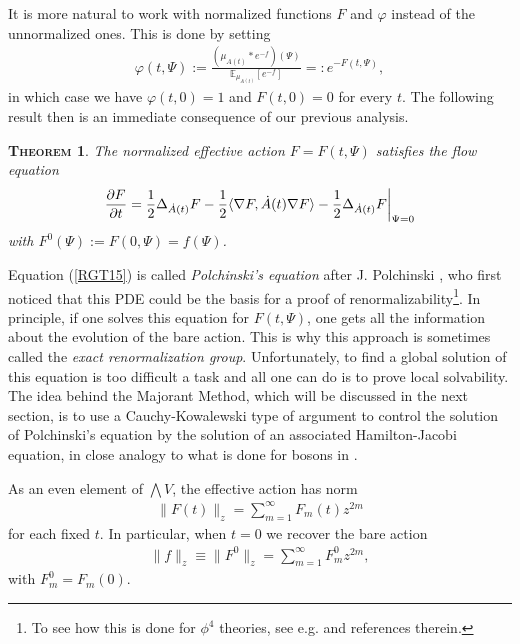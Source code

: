 \documentclass[12pt,twoside]{amsart}
\newcommand{\E}{{\mathbb{E}}}
\newtheorem{theo}{\textsc{Theorem}}[section]
\numberwithin{equation}{section}
\begin{document}
It is more natural to work with normalized functions $F$ and $\varphi$ instead of the unnormalized ones. This is done by setting
\begin{eqnarray}
\varphi(t,\Psi) := \frac{(\mu_{A(t)}*e^{-f})(\Psi)}{\E_{\mu_{A(t)}}[e^{-f}]} =: e^{-F(t,\Psi)}, \label{RGT14}
\end{eqnarray}
in which case we have $\varphi(t, 0) = 1$ and $F(t,0) = 0$ for every $t$. The following result then is an immediate consequence of our previous analysis.

\begin{theo}\label{polchinskiequation} The normalized effective action $F=F(t,\Psi)$ satisfies the flow equation
\begin{eqnarray}
\frac{\partial F}{\partial t} = \frac{1}{2}\Delta_{\dot{A}(t)}F - \frac{1}{2}\langle \nabla F, \dot{A}(t)\nabla F\rangle -\frac{1}{2}\Delta_{\dot{A}(t)}F\bigg{|}_{\Psi = 0} \label{RGT15}
\end{eqnarray}
with $F^{0}(\Psi) := F(0,\Psi) = f(\Psi)$.
\end{theo}

Equation (\ref{RGT15}) is called \textit{Polchinski's equation} after J. Polchinski \cite{Polch}, who first noticed that this PDE could be the basis for a proof of renormalizability\footnote{To see how this is done for $\phi^{4}$ theories, see e.g. \cite{MSbook,KKS} and references therein.}. In principle, if one solves this equation for $F(t,\Psi)$, one gets all the information about the evolution of the bare action. This is why this approach is sometimes called the \textit{exact renormalization group}. Unfortunately, to find a global solution of this equation is too difficult a task and all one can do is to prove local solvability. The idea behind the Majorant Method, which will be discussed in the next section, is to use a Cauchy-Kowalewski type of argument to control the solution of Polchinski's equation by the solution of an associated Hamilton-Jacobi equation, in close analogy to what is done for bosons in \cite{BryKen,BryWri}.
 
As an even element of $\bigwedge V$, the effective action has norm
\begin{eqnarray}
\|F(t)\|_{z} = \sum_{m=1}^{\infty}F_{m}(t)z^{2m} \label{RGT16}
\end{eqnarray}
for each fixed $t$. In particular, when $t=0$ we recover the bare action
\begin{eqnarray}
\|f\|_{z} \equiv \|F^{0}\|_{z} = \sum_{m=1}^{\infty}F_{m}^{0}z^{2m}, \label{RGT17}
\end{eqnarray}
with $F_{m}^{0} = F_{m}(0)$. 
\end{document}
